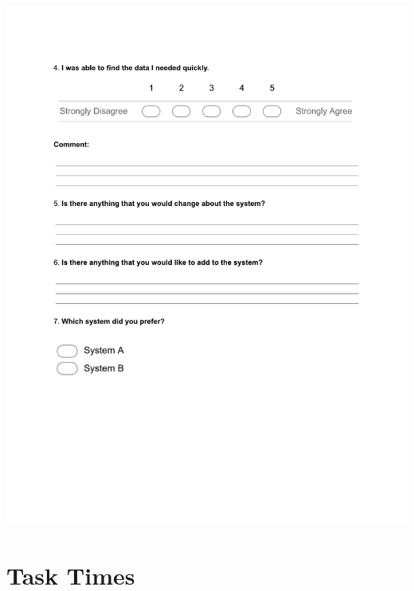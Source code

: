 \newpage
\begin{centering}
\includegraphics[trim = 40 160 0 60,scale=0.9]{forms/finalEvaluationPage2.pdf}
\end{centering}

\newpage
\section{Task Times}


